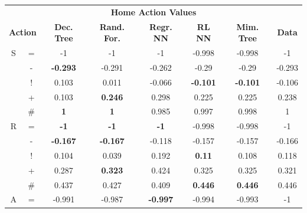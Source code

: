 \documentclass{sfuthesis}
\begin{document}
	\begin{table}
		\centering
		\begin{tabular}{cc|ccccc|c}
			\multicolumn{8}{c}{\textbf{Home Action Values}}                                                                                                                                                  \\
			\multicolumn{2}{c|}{\textbf{Action}} & \textbf{Dec. Tree} & \textbf{Rand. For.} & \textbf{Regr. NN} & \textbf{RL NN} & {\textbf{Mim. Tree}} & \textbf{Data} \\ \hline
			S              & =                & -1                 & -1                  & -1                & -0.998         & -0.998             & -1            \\
			& -                &\textbf{-0.293}             & -0.291              & -0.262            & -0.29          & -0.29              & -0.293        \\
			& !                & 0.103              & 0.011               & -0.066            & \textbf{-0.101}         & \textbf{-0.101}             & -0.106        \\
			& +                & 0.103              & \textbf{0.246}               & 0.298             & 0.225          & 0.225              & 0.238         \\
			& \#               & \textbf{1}                  & \textbf{1}                   & 0.985             & 0.997          & 0.998              & 1             \\ \hline
			R              & =                & \textbf{-1}                 & \textbf{-1}                  & \textbf{-1}                & -0.998         & -0.998             & -1            \\
			& -                & \textbf{-0.167}             & \textbf{-0.167}              & -0.118            & -0.157         & -0.157             & -0.166        \\
			& !                & 0.104              & 0.039               & 0.192             & \textbf{0.11}           & 0.108              & 0.118         \\
			& +                & 0.287              & \textbf{0.323}               & 0.424             & 0.325          & 0.325              & 0.321         \\
			& \#               & 0.437              & 0.427               & 0.409             & \textbf{0.446}          & \textbf{0.446}              & 0.446         \\ \hline
			A              & =                & -0.991             & -0.987              & \textbf{-0.997}            & -0.994         & -0.993             & -1            \\

\end{tabular}
\end{table}
\end{document}
